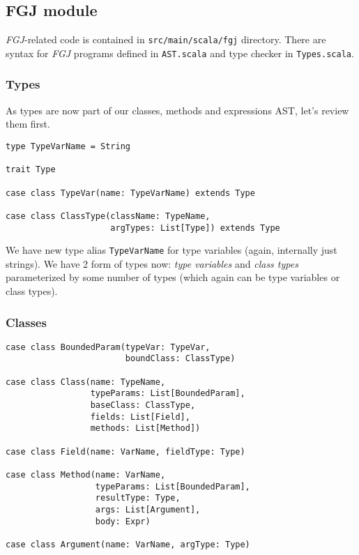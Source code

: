 \documentclass{article}[12pt]
\begin{document}
\subsection{FGJ module}

\emph{FGJ}-related code is contained in \texttt{src/main/scala/fgj}
directory. There are syntax for \emph{FGJ} programs defined in
\texttt{AST.scala} and type checker in \texttt{Types.scala}.

\subsubsection{Types}

As types are now part of our classes, methods and expressions
AST, let's review them first.

\begin{verbatim}
type TypeVarName = String

trait Type

case class TypeVar(name: TypeVarName) extends Type

case class ClassType(className: TypeName,
                     argTypes: List[Type]) extends Type
\end{verbatim}

We have new type alias \texttt{TypeVarName} for type variables
(again, internally just strings). We have 2 form of types now:
\emph{type variables} and \emph{class types} parameterized by
some number of types (which again can be type variables or
class types).

\subsubsection{Classes}

\begin{verbatim}
case class BoundedParam(typeVar: TypeVar,
                        boundClass: ClassType)

case class Class(name: TypeName,
                 typeParams: List[BoundedParam],
                 baseClass: ClassType,
                 fields: List[Field],
                 methods: List[Method])

case class Field(name: VarName, fieldType: Type)

case class Method(name: VarName,
                  typeParams: List[BoundedParam],
                  resultType: Type,
                  args: List[Argument],
                  body: Expr)
                  
case class Argument(name: VarName, argType: Type)
\end{verbatim}
\end{document}
